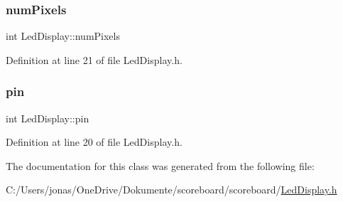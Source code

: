 \subsubsection{\texorpdfstring{num\+Pixels}{numPixels}}
{\footnotesize\ttfamily int Led\+Display\+::num\+Pixels\hspace{0.3cm}{\ttfamily [private]}}



Definition at line 21 of file Led\+Display.\+h.

\mbox{\label{class_led_display_ada84aea1dfd3e348efd492dfdccf596d}} 
\subsubsection{\texorpdfstring{pin}{pin}}
{\footnotesize\ttfamily int Led\+Display\+::pin\hspace{0.3cm}{\ttfamily [private]}}



Definition at line 20 of file Led\+Display.\+h.



The documentation for this class was generated from the following file\+:\begin{DoxyCompactItemize}
\item 
C\+:/\+Users/jonas/\+One\+Drive/\+Dokumente/scoreboard/scoreboard/\hyperlink{_led_display_8h}{Led\+Display.\+h}\end{DoxyCompactItemize}
